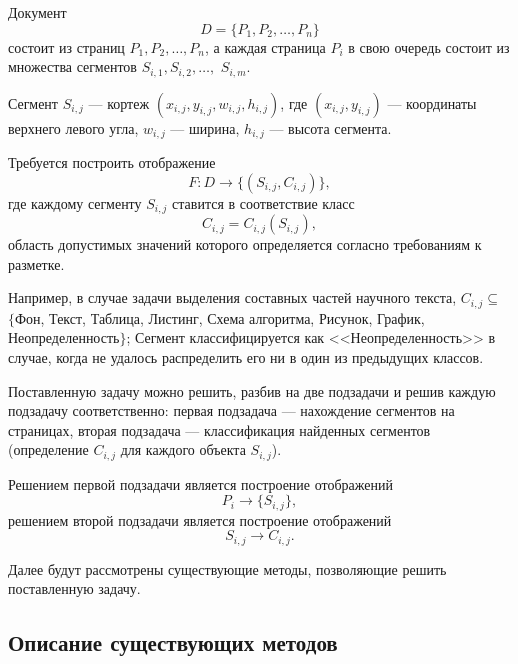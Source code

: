 Документ
\begin{equation}
    D = \{ P_1, P_2 , \dots, P_n \}
    \label{eq:d}
\end{equation}
состоит из страниц $ P_1, P_2, \dots, P_n $, а каждая страница $ P_i $ в свою очередь состоит из множества сегментов $ S_{i,1}, S_{i,2}, \dots, $ $S_{i,m} $.

Сегмент $S_{i,j}$ --- кортеж $(x_{i,j}, y_{i,j}, w_{i,j}, h_{i,j})$, где $(x_{i,j}, y_{i,j})$ --- координаты верхнего левого угла, $w_{i,j}$ --- ширина, $h_{i,j}$ --- высота сегмента.

Требуется построить отображение
\begin{equation}
    F : D \to \{(S_{i,j}, C_{i,j})\},
    \label{eq:f}
\end{equation}
где каждому сегменту $S_{i,j}$ ставится в соответствие класс
\begin{equation}
    C_{i,j} = C_{i,j}(S_{i,j}),
    \label{eq:c}
\end{equation}
область допустимых значений которого определяется согласно требованиям к разметке.

Например, в случае задачи выделения составных частей научного текста, $C_{i,j} \subseteq$ $\{${Фон, Текст, Таблица, Листинг, Схема алгоритма, Рисунок, График, Неопределенность}$\}$;
Сегмент классифицируется как <<Неопределенность>> в случае, когда не удалось распределить его ни в один из предыдущих классов.

Поставленную задачу можно решить, разбив на две подзадачи и решив каждую подзадачу соответственно: первая подзадача --- нахождение сегментов на страницах, вторая подзадача --- классификация найденных сегментов (определение $C_{i,j}$ для каждого объекта $S_{i,j}$).

Решением первой подзадачи является построение отображений
\begin{equation}
    P_i \to \{ S_{i,j} \},
    \label{eq:p}
\end{equation}
решением второй подзадачи является построение отображений
\begin{equation}
    S_{i,j} \to C_{i,j}.
    \label{eq:o}
\end{equation}

Далее будут рассмотрены существующие методы, позволяющие решить поставленную задачу.

\subsection{Описание существующих методов}

